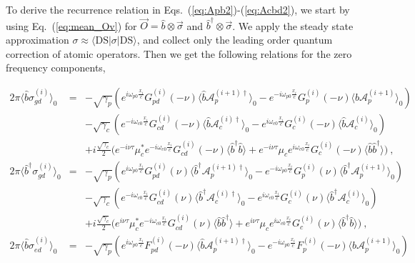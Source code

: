 \documentclass[aps, pra, reprint, amsmath, amssymb, groupedaddress, acknowledgments]{revtex4-1}
\begin{document}
To derive the recurrence relation in Eqs.~(\ref{eq:Apb2})-(\ref{eq:Acbd2}), we start by using Eq.~(\ref{eq:mean_Ov}) for $\vec{O}=\hat{b}\otimes \vec{\sigma}$ and $\hat{b}^\dag\otimes \vec{\sigma}$.  We apply the steady state approximation $\sigma\approx \langle\textrm{DS}| \sigma|\textrm{DS}\rangle$, and collect only the leading order quantum correction of atomic operators.  Then we get the following relations for the zero frequency components,
\begin{widetext}
\begin{eqnarray}
2 \pi \langle\hat{b}\sigma_{gd}^{(i)}\rangle_0 &=& -\sqrt{\gamma_p} (e^{i\omega_{p0} \frac{x_i}{c}} G^{(i)}_{pd}(-\nu) \langle \hat{b} \mathcal{A}_p^{(i+1)\dag} \rangle_0 - e^{-i\omega_{p0} \frac{x_i}{c}} G^{(i)}_{p}(-\nu) \langle \hat{b} \mathcal{A}_p^{(i+1)} \rangle_0) \nonumber \\
&&-\sqrt{\gamma_c} (e^{-i\omega_{c0} \frac{x_i}{c}} G^{(i)}_{cd}(-\nu) \langle \hat{b} \mathcal{A}_c^{(i)\dag} \rangle_0 - e^{i\omega_{c0} \frac{x_i}{c}} G^{(i)}_{c}(-\nu) \langle \hat{b} \mathcal{A}_c^{(i)} \rangle_0) \nonumber \\
&&+ i\frac{\sqrt{\gamma_c}}{2}\big(e^{-i\nu\tau} \mu_c^\ast e^{-i\omega_{c0} \frac{x_i}{c}} G^{(i)}_{cd}(-\nu) \langle\hat{b}^\dag \hat{b}\rangle + e^{-i\nu\tau} \mu_c e^{i\omega_{c0} \frac{x_i}{c}} G^{(i)}_c(-\nu) \langle\hat{b} \hat{b}^\dag\rangle \big)~, \\
2 \pi \langle\hat{b}^\dag\sigma_{gd}^{(i)}\rangle_0 &=& -\sqrt{\gamma_p} (e^{i\omega_{p0} \frac{x_i}{c}} G^{(i)}_{pd}(\nu) \langle \hat{b}^\dag \mathcal{A}_p^{(i+1)\dag} \rangle_0 - e^{-i\omega_{p0} \frac{x_i}{c}} G^{(i)}_{p}(\nu) \langle \hat{b}^\dag \mathcal{A}_p^{(i+1)} \rangle_0) \nonumber \\
&&-\sqrt{\gamma_c} (e^{-i\omega_{c0} \frac{x_i}{c}} G^{(i)}_{cd}(\nu) \langle \hat{b}^\dag \mathcal{A}_c^{(i)\dag} \rangle_0 - e^{i\omega_{c0} \frac{x_i}{c}} G^{(i)}_{c}(\nu) \langle \hat{b}^\dag \mathcal{A}_c^{(i)} \rangle_0) \nonumber \\
&&+ i\frac{\sqrt{\gamma_c}}{2}\big(e^{i\nu\tau}\mu_c^\ast e^{-i\omega_{c0} \frac{x_i}{c}} G^{(i)}_{cd}(\nu) \langle\hat{b}\hat{b}^\dag\rangle + e^{i\nu\tau}\mu_c e^{i\omega_{c0} \frac{x_i}{c}} G^{(i)}_c(\nu) \langle\hat{b}^\dag  \hat{b}\rangle \big)~, \\
2 \pi \langle\hat{b}\sigma_{ed}^{(i)}\rangle_0 &=& -\sqrt{\gamma_p} (e^{i\omega_{p0} \frac{x_i}{c}} F^{(i)}_{pd}(-\nu) \langle \hat{b} \mathcal{A}_p^{(i+1)\dag} \rangle_0 - e^{-i\omega_{p0} \frac{x_i}{c}} F^{(i)}_{p}(-\nu) \langle \hat{b} \mathcal{A}_p^{(i+1)} \rangle_0) \nonumber \\

\end{eqnarray}
\end{widetext}
\end{document}
